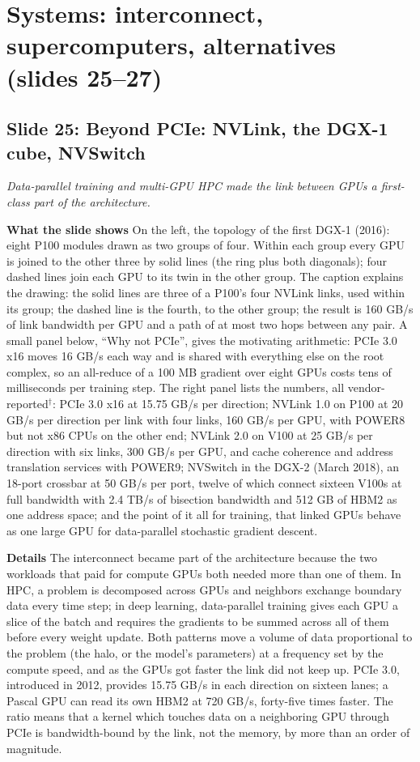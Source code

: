 \documentclass[11pt,letterpaper]{article}
\newcommand{\slide}[3]{%
  \subsection[Slide #1: #2]{Slide #1: #2}%
  {\color{muted}\itshape #3\par}\medskip}
\newcommand{\para}[1]{\medskip\noindent\textbf{#1}\quad}
\begin{document}
\section{Systems: interconnect, supercomputers, alternatives (slides 25--27)}

\slide{25}{Beyond PCIe: NVLink, the DGX-1 cube, NVSwitch}{Data-parallel training and multi-GPU HPC made the link between GPUs a first-class part of the architecture.}

\para{What the slide shows} On the left, the topology of the first DGX-1 (2016): eight P100 modules drawn as two groups of four. Within each group every GPU is joined to the other three by solid lines (the ring plus both diagonals); four dashed lines join each GPU to its twin in the other group. The caption explains the drawing: the solid lines are three of a P100's four NVLink links, used within its group; the dashed line is the fourth, to the other group; the result is 160 GB/s of link bandwidth per GPU and a path of at most two hops between any pair. A small panel below, ``Why not PCIe'', gives the motivating arithmetic: PCIe 3.0 x16 moves 16 GB/s each way and is shared with everything else on the root complex, so an all-reduce of a 100 MB gradient over eight GPUs costs tens of milliseconds per training step. The right panel lists the numbers, all vendor-reported$^\dagger$: PCIe 3.0 x16 at 15.75 GB/s per direction; NVLink 1.0 on P100 at 20 GB/s per direction per link with four links, 160 GB/s per GPU, with POWER8 but not x86 CPUs on the other end; NVLink 2.0 on V100 at 25 GB/s per direction with six links, 300 GB/s per GPU, and cache coherence and address translation services with POWER9; NVSwitch in the DGX-2 (March 2018), an 18-port crossbar at 50 GB/s per port, twelve of which connect sixteen V100s at full bandwidth with 2.4 TB/s of bisection bandwidth and 512 GB of HBM2 as one address space; and the point of it all for training, that linked GPUs behave as one large GPU for data-parallel stochastic gradient descent.

\para{Details} The interconnect became part of the architecture because the two workloads that paid for compute GPUs both needed more than one of them. In HPC, a problem is decomposed across GPUs and neighbors exchange boundary data every time step; in deep learning, data-parallel training gives each GPU a slice of the batch and requires the gradients to be summed across all of them before every weight update. Both patterns move a volume of data proportional to the problem (the halo, or the model's parameters) at a frequency set by the compute speed, and as the GPUs got faster the link did not keep up. PCIe 3.0, introduced in 2012, provides 15.75 GB/s in each direction on sixteen lanes; a Pascal GPU can read its own HBM2 at 720 GB/s, forty-five times faster. The ratio means that a kernel which touches data on a neighboring GPU through PCIe is bandwidth-bound by the link, not the memory, by more than an order of magnitude.
\end{document}
